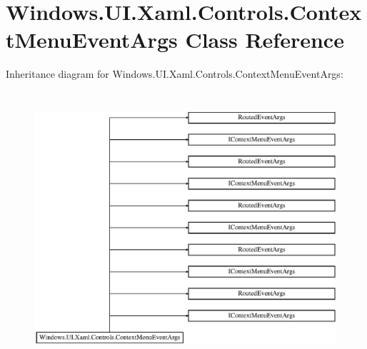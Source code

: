 \hypertarget{class_windows_1_1_u_i_1_1_xaml_1_1_controls_1_1_context_menu_event_args}{}\section{Windows.\+U\+I.\+Xaml.\+Controls.\+Context\+Menu\+Event\+Args Class Reference}
\label{class_windows_1_1_u_i_1_1_xaml_1_1_controls_1_1_context_menu_event_args}
Inheritance diagram for Windows.\+U\+I.\+Xaml.\+Controls.\+Context\+Menu\+Event\+Args\+:\begin{figure}[H]
\begin{center}
\leavevmode
\includegraphics[height=10.098360cm]{class_windows_1_1_u_i_1_1_xaml_1_1_controls_1_1_context_menu_event_args}
\end{center}
\end{figure}

